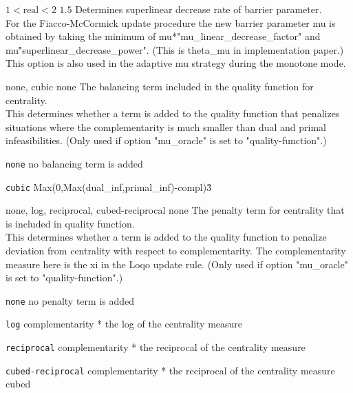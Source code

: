 %
{$1<\textrm{real}<2$}%
{$1.5$}%
{Determines superlinear decrease rate of barrier parameter.\\
For the Fiacco-McCormick update procedure the new barrier parameter mu is obtained by taking the minimum of mu*"mu\_linear\_decrease\_factor" and mu\^"superlinear\_decrease\_power".  (This is theta\_mu in implementation paper.) This option is also used in the adaptive mu strategy during the monotone mode.}%
{}

%
{\ttfamily none, cubic}%
{none}%
{The balancing term included in the quality function for centrality.\\
This determines whether a term is added to the quality function that penalizes situations where the complementarity is much smaller than dual and primal infeasibilities. (Only used if option "mu\_oracle" is set to "quality-function".)}%
{\begin{list}{}{
\setlength{\parsep}{0em}
\setlength{\leftmargin}{5ex}
\setlength{\labelwidth}{2ex}
\setlength{\itemindent}{0ex}
\setlength{\topsep}{0pt}}
\item[\texttt{none}] no balancing term is added
\item[\texttt{cubic}] Max(0,Max(dual\_inf,primal\_inf)-compl)\^3
\end{list}
}

%
{\ttfamily none, log, reciprocal, cubed-reciprocal}%
{none}%
{The penalty term for centrality that is included in quality function.\\
This determines whether a term is added to the quality function to penalize deviation from centrality with respect to complementarity.  The complementarity measure here is the xi in the Loqo update rule. (Only used if option "mu\_oracle" is set to "quality-function".)}%
{\begin{list}{}{
\setlength{\parsep}{0em}
\setlength{\leftmargin}{5ex}
\setlength{\labelwidth}{2ex}
\setlength{\itemindent}{0ex}
\setlength{\topsep}{0pt}}
\item[\texttt{none}] no penalty term is added
\item[\texttt{log}] complementarity * the log of the centrality measure
\item[\texttt{reciprocal}] complementarity * the reciprocal of the centrality measure
\item[\texttt{cubed-reciprocal}] complementarity * the reciprocal of the centrality measure cubed
\end{list}
}

